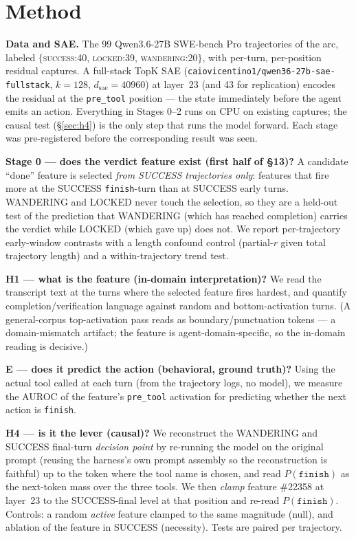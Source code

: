 \documentclass[11pt]{article}
\begin{document}
\section{Method}\label{sec:method}

\textbf{Data and SAE.} The 99 Qwen3.6-27B SWE-bench Pro trajectories of the arc, labeled $\{$\textsc{success}:40, \textsc{locked}:39, \textsc{wandering}:20$\}$, with per-turn, per-position residual captures. A full-stack TopK SAE (\texttt{caiovicentino1/qwen36-27b-sae-fullstack}, $k=128$, $d_{\text{sae}}=40960$) at layer~23 (and 43 for replication) encodes the residual at the \texttt{pre\_tool} position --- the state immediately before the agent emits an action. Everything in Stages 0--2 runs on CPU on existing captures; the causal test (\S\ref{sec:h4}) is the only step that runs the model forward. Each stage was pre-registered before the corresponding result was seen.

\textbf{Stage 0 --- does the verdict feature exist (first half of \S13)?} A candidate ``done'' feature is selected \emph{from SUCCESS trajectories only}: features that fire more at the SUCCESS \texttt{finish}-turn than at SUCCESS early turns. WANDERING and LOCKED never touch the selection, so they are a held-out test of the prediction that WANDERING (which has reached completion) carries the verdict while LOCKED (which gave up) does not. We report per-trajectory early-window contrasts with a length confound control (partial-$r$ given total trajectory length) and a within-trajectory trend test.

\textbf{H1 --- what is the feature (in-domain interpretation)?} We read the transcript text at the turns where the selected feature fires hardest, and quantify completion/verification language against random and bottom-activation turns. (A general-corpus top-activation pass reads as boundary/punctuation tokens --- a domain-mismatch artifact; the feature is agent-domain-specific, so the in-domain reading is decisive.)

\textbf{E --- does it predict the action (behavioral, ground truth)?} Using the actual tool called at each turn (from the trajectory logs, no model), we measure the AUROC of the feature's \texttt{pre\_tool} activation for predicting whether the next action is \texttt{finish}.

\textbf{H4 --- is it the lever (causal)?} \label{sec:method_h4} We reconstruct the WANDERING and SUCCESS final-turn \emph{decision point} by re-running the model on the original prompt (reusing the harness's own prompt assembly so the reconstruction is faithful) up to the token where the tool name is chosen, and read $P(\texttt{finish})$ as the next-token mass over the three tools. We then \emph{clamp} feature \#22358 at layer~23 to the SUCCESS-final level at that position and re-read $P(\texttt{finish})$. Controls: a random \emph{active} feature clamped to the same magnitude (null), and ablation of the feature in SUCCESS (necessity). Tests are paired per trajectory.
\end{document}
